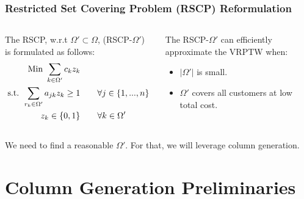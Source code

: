\documentclass{beamer}
\begin{document}
	\begin{frame}[t]
		\frametitle{Restricted Set Covering Problem (RSCP) Reformulation}
		\small
		\begin{columns}[T]
			\begin{column}{0.55\textwidth}
				The RSCP, w.r.t $\Omega' \subset \Omega $, (RSCP-$ \Omega' $) is formulated as follows:
				\begin{align}
					\text{Min } \sum_{k \in \Omega'}c_k z_k& \notag \\
					\text{s.t. } \sum_{r_k \in \Omega'} a_{jk} z_k \geq 1 &\qquad \forall j \in \{1,...,n\} \label{c:restricted_set_covering} \\
					z_k \in \{0, 1\} &\qquad \forall k \in \Omega' \notag
				\end{align}
			\end{column}
			\begin{column}{0.45\textwidth}
				The RSCP-$ \Omega' $ can efficiently approximate the VRPTW when:
				\begin{itemize}
					\item $ |\Omega'| $ is small.
					\item $ \Omega' $ covers all customers at low total cost.
				\end{itemize}
			\end{column}
		\end{columns}
		\vspace{2.75cm}
		\begin{block}{}
			We need to find a reasonable $ \Omega' $. For that, we will leverage column generation.
		\end{block}
		\normalsize
	\end{frame}

	\section{Column Generation Preliminaries}
	
\end{document}
